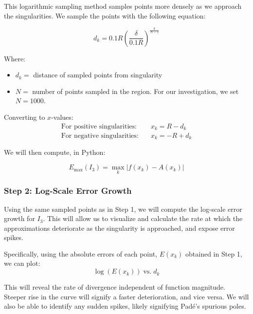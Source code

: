 \documentclass[a4paper, 12pt]{article}
\begin{document}
This logarithmic sampling method samples points more densely as we approach the singularities. We sample the points with the following equation:

\begin{equation}
    d_k=0.1R\left(\frac{\delta}{0.1R}\right)^{\frac{k}{N-1}}
\end{equation}

Where:
\begin{itemize}
    \item $d_k =$ distance of sampled points from singularity
    \item $N =$ number of points sampled in the region. For our investigation, we set $N=1000$.
\end{itemize}

Converting to $x$-values:
\begin{equation}
\begin{alignedat}{2}
\text{For positive singularities:} &\quad x_k = R - d_k \\
\text{For negative singularities:} &\quad x_k = -R + d_k
\end{alignedat}
\end{equation}

We will then compute, in Python:

\begin{equation}
    E_{\max}(I_3)=\max_k\left|f(x_k)-A(x_k)\right|
\end{equation}

\subsubsection{Step 2: Log-Scale Error Growth}
Using the same sampled points as in Step 1, we will compute the log-scale error growth for $I_3$. This will allow us to visualize and calculate the rate at which the approximations deteriorate as the singularity is approached, and expose error spikes. 

Specifically, using the absolute errors of each point, $E(x_k)$ obtained in Step 1, we can plot:
\begin{equation}
    \log\left(E\left(x_k\right)\right) \; \text{vs.} \; d_k
\end{equation}

This will reveal the rate of divergence independent of function magnitude. Steeper rise in the curve will signify a faster deterioration, and vice versa. We will also be able to identify any sudden spikes, likely signifying Padé's spurious poles.
\end{document}
